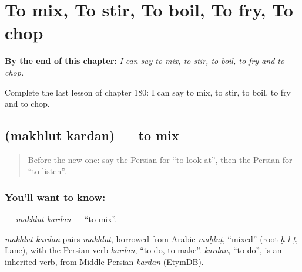 
\chapter{To mix, To stir, To boil, To fry, To chop}
\label{ch:fa-to-mix-to-stir-to-boil-to-fry-to-chop}

\begin{chapteropening}
\textbf{By the end of this chapter:} \emph{I can say to mix, to stir, to boil, to fry and to chop.}

Complete the last lesson of chapter 180: I can say to mix, to stir, to boil, to fry and to chop.
\end{chapteropening}

\section[\texorpdfstring{\fa{مخلوط} \fa{کردن} (makhlut kardan)}{مخلوط کردن (makhlut kardan)}]{  (makhlut kardan) — to mix}

\label{lesson:FA-C180-makhlut-kardan}



\begin{quote}
Before the new one: say the Persian for \textquotedblleft{}to look at\textquotedblright{}, then the Persian for \textquotedblleft{}to listen\textquotedblright{}.
\end{quote}

\subsection*{You'll want to know:  }
\textbf{ } — \emph{makhlut kardan} — \textquotedblleft{}to mix\textquotedblright{}.

\begin{cousinweb}
\emph{makhlut kardan} pairs \emph{makhlut}, borrowed from Arabic \emph{maḫlūṭ}, \textquotedblleft{}mixed\textquotedblright{} (root \emph{ḫ-l-ṭ}, Lane), with the Persian verb \emph{kardan}, \textquotedblleft{}to do, to make\textquotedblright{}. \emph{kardan}, \textquotedblleft{}to do\textquotedblright{}, is an inherited verb, from Middle Persian \emph{kardan} (EtymDB).
\end{cousinweb}

